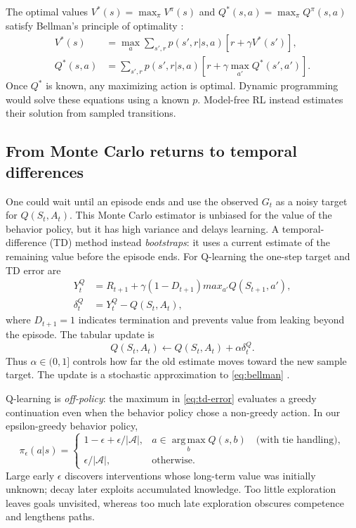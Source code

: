 \documentclass[11pt]{article}
\newcommand{\argmax}{\operatorname*{arg\,max}}
\begin{document}
The optimal values $V^*(s)=\max_\pi V^\pi(s)$ and
$Q^*(s,a)=\max_\pi Q^\pi(s,a)$ satisfy Bellman's principle of optimality
\cite{bellman1957}:
\begin{align}
 V^*(s)&=\max_a\sum_{s',r}p(s',r|s,a)[r+\gamma V^*(s')],\\
 Q^*(s,a)&=\sum_{s',r}p(s',r|s,a)
 [r+\gamma\max_{a'}Q^*(s',a')]. \label{eq:bellman}
\end{align}
Once $Q^*$ is known, any maximizing action is optimal. Dynamic programming
would solve these equations using a known $p$. Model-free RL instead estimates
their solution from sampled transitions.

\subsection{From Monte Carlo returns to temporal differences}

One could wait until an episode ends and use the observed $G_t$ as a noisy
target for $Q(S_t,A_t)$. This Monte Carlo estimator is unbiased for the value
of the behavior policy, but it has high variance and delays learning. A
temporal-difference (TD) method instead \emph{bootstraps}: it uses a current
estimate of the remaining value before the episode ends. For Q-learning the
one-step target and TD error are
\begin{align}
 Y_t^Q&=R_{t+1}+\gamma(1-D_{t+1})max_{a'}Q(S_{t+1},a'),\\
 \delta_t^Q&=Y_t^Q-Q(S_t,A_t),
 \label{eq:td-error}
\end{align}
where $D_{t+1}=1$ indicates termination and prevents value from leaking beyond
the episode. The tabular update is
\begin{equation}
 Q(S_t,A_t)\leftarrow Q(S_t,A_t)+\alpha\delta_t^Q.
 \label{eq:qlearn}
\end{equation}
Thus $\alpha\in(0,1]$ controls how far the old estimate moves toward the new
sample target. The update is a stochastic approximation to
\cref{eq:bellman} \cite{watkins1992}.

Q-learning is \emph{off-policy}: the maximum in \cref{eq:td-error} evaluates a
greedy continuation even when the behavior policy chose a non-greedy action.
In our epsilon-greedy behavior policy,
\begin{equation}
 \pi_\epsilon(a|s)=
 \begin{cases}
  1-\epsilon+\epsilon/|\mathcal A|,&
     a\in\argmax_bQ(s,b)\quad\text{(with tie handling)},\\
  \epsilon/|\mathcal A|,&\text{otherwise}.
 \end{cases}
 \label{eq:epsilon-greedy}
\end{equation}
Large early $\epsilon$ discovers interventions whose long-term value was
initially unknown; decay later exploits accumulated knowledge. Too little
exploration leaves goals unvisited, whereas too much late exploration obscures
competence and lengthens paths.
\end{document}
